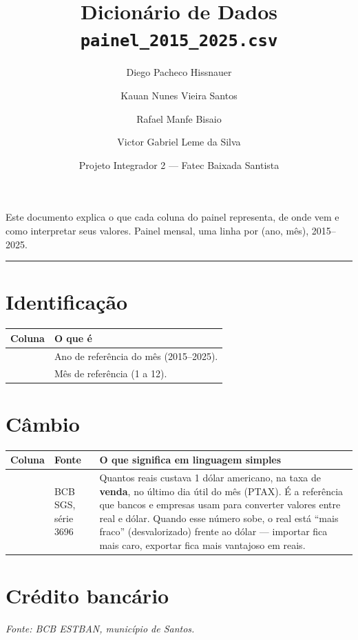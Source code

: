 \documentclass[11pt,a4paper]{article}
\title{\vspace{-1.5cm}\textbf{Dicionário de Dados}\\[0.3em]\Large \texttt{painel\_2015\_2025.csv}}
\author{Diego Pacheco Hissnauer \and Kauan Nunes Vieira Santos \and Rafael Manfe Bisaio \and Victor Gabriel Leme da Silva}
\date{Projeto Integrador 2 --- Fatec Baixada Santista}
\begin{document}
\maketitle
\thispagestyle{fancy}

\noindent Este documento explica o que cada coluna do painel representa, de onde vem e como interpretar seus valores. Painel mensal, uma linha por (ano, mês), 2015--2025.

\vspace{0.5em}
\hrule
\vspace{1em}

\section*{Identificação}
\begin{longtable}{L{3.2cm} L{11cm}}
\toprule
\textbf{Coluna} & \textbf{O que é} \\
\midrule
\endhead
\texttt{} & Ano de referência do mês (2015--2025). \\
\texttt{} & Mês de referência (1 a 12). \\
\bottomrule
\end{longtable}

\section*{Câmbio}
\begin{longtable}{L{2.6cm} L{2.6cm} L{9cm}}
\toprule
\textbf{Coluna} & \textbf{Fonte} & \textbf{O que significa em linguagem simples} \\
\midrule
\endhead
\texttt{} & BCB SGS, série 3696 &
Quantos reais custava 1 dólar americano, na taxa de \textbf{venda}, no último dia útil do mês (PTAX). É a referência que bancos e empresas usam para converter valores entre real e dólar. Quando esse número sobe, o real está ``mais fraco'' (desvalorizado) frente ao dólar --- importar fica mais caro, exportar fica mais vantajoso em reais. \\
\bottomrule
\end{longtable}

\section*{Crédito bancário}
\textit{Fonte: BCB ESTBAN, município de Santos.}
\end{document}
